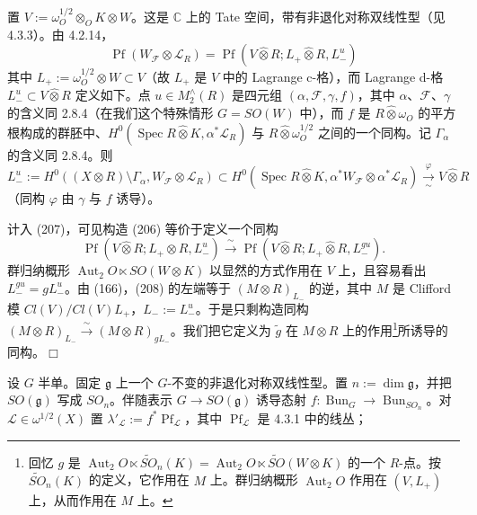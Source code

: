 
置 $V:=\omega_{O}^{1/2}\otimes_{O}K\otimes W$。这是 $\mathbb{C}$ 上的 Tate 空间，带有非退化对称双线性型（见 4.3.3）。由 4.2.14，
\begin{equation}\tag{207}
\operatorname{Pf}(W_{\mathcal{F}}\otimes\mathcal{L}_{R})=\operatorname{Pf}(V\hat\otimes R;L_{+}\hat\otimes R,L^{u}_{-})
\end{equation}
其中 $L_{+}:=\omega_{O}^{1/2}\otimes W\subset V$（故 $L_{+}$ 是 $V$ 中的 Lagrange c-格），而 Lagrange d-格 $L^{u}_{-}\subset V\hat\otimes R$ 定义如下。点 $u\in M_{2}^{\wedge}(R)$ 是四元组 $(\alpha,\mathcal{F},\gamma,f)$，其中 $\alpha$、$\mathcal{F}$、$\gamma$ 的含义同 2.8.4（在我们这个特殊情形 $G=SO(W)$ 中），而 $f$ 是 $R\hat\otimes\omega_{O}$ 的平方根构成的群胚中、$H^{0}(\operatorname{Spec}R\hat\otimes K,\alpha^{*}\mathcal{L}_{R})$ 与 $R\hat\otimes\omega_{O}^{1/2}$ 之间的一个同构。记 $\Gamma_{\alpha}$ 的含义同 2.8.4。则
\[
L^{u}_{-}:=H^{0}((X\otimes R)\setminus\Gamma_{\alpha},W_{\mathcal{F}}\otimes\mathcal{L}_{R})\subset H^{0}(\operatorname{Spec}R\hat\otimes K,\alpha^{*}W_{\mathcal{F}}\otimes\alpha^{*}\mathcal{L}_{R})\xrightarrow[\ \sim\ ]{\varphi}V\hat\otimes R
\]
（同构 $\varphi$ 由 $\gamma$ 与 $f$ 诱导）。

计入 (207)，可见构造 (206) 等价于定义一个同构
\begin{equation}\tag{208}
\operatorname{Pf}(V\hat\otimes R;L_{+}\hat\otimes R,L^{u}_{-})\xrightarrow{\ \sim\ }\operatorname{Pf}(V\hat\otimes R;L_{+}\hat\otimes R,L^{gu}_{-}).
\end{equation}
群归纳概形 $\operatorname{Aut}_{2}O\ltimes SO(W\otimes K)$ 以显然的方式作用在 $V$ 上，且容易看出 $L^{gu}_{-}=gL^{u}_{-}$。由 (166)，(208) 的左端等于 $(M\otimes R)_{L_{-}}$ 的逆，其中 $M$ 是 Clifford 模 $Cl(V)/Cl(V)L_{+}$，$L_{-}:=L^{u}_{-}$。于是只剩构造同构 $(M\otimes R)_{L_{-}}\xrightarrow{\ \sim\ }(M\otimes R)_{gL_{-}}$。我们把它定义为 $\tilde{g}$ 在 $M\otimes R$ 上的作用\footnote{回忆 $g$ 是 $\operatorname{Aut}_{2}O\ltimes\tilde{SO}_{n}(K)=\operatorname{Aut}_{2}O\ltimes\tilde{SO}(W\otimes K)$ 的一个 $R$-点。按 $\tilde{SO}_{n}(K)$ 的定义，它作用在 $M$ 上。群归纳概形 $\operatorname{Aut}_{2}O$ 作用在 $(V,L_{+})$ 上，从而作用在 $M$ 上。}所诱导的同构。\hfill$\Box$


 设 $G$ 半单。固定 $\mathfrak{g}$ 上一个 $G$-不变的非退化对称双线性型。置 $n:=\dim\mathfrak{g}$，并把 $SO(\mathfrak{g})$ 写成 $SO_{n}$。伴随表示 $G\to SO(\mathfrak{g})$ 诱导态射 $f:\operatorname{Bun}_{G}\to\operatorname{Bun}_{SO_{n}}$。对 $\mathcal{L}\in\omega^{1/2}(X)$ 置 $\lambda'_{\mathcal{L}}:=f^{*}\operatorname{Pf}_{\mathcal{L}}$，其中 $\operatorname{Pf}_{\mathcal{L}}$ 是 4.3.1 中的线丛；

